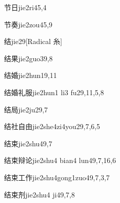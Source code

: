 \begin{verbete}{节日}{jie2ri4}{5,4}
\end{verbete}

\begin{verbete}{节奏}{jie2zou4}{5,9}
\end{verbete}

\begin{verbete}{结}{jie2}{9}[Radical 糸]
\end{verbete}

\begin{verbete}{结果}{jie2guo3}{9,8}
\end{verbete}

\begin{verbete}{结婚}{jie2hun1}{9,11}
\end{verbete}

\begin{verbete}{结婚礼服}{jie2hun1 li3 fu2}{9,11,5,8}
\end{verbete}

\begin{verbete}{结局}{jie2ju2}{9,7}
\end{verbete}

\begin{verbete}{结社自由}{jie2she4zi4you2}{9,7,6,5}
\end{verbete}

\begin{verbete}{结束}{jie2shu4}{9,7}
\end{verbete}

\begin{verbete}{结束辩论}{jie2shu4 bian4 lun4}{9,7,16,6}
\end{verbete}

\begin{verbete}{结束工作}{jie2shu4gong1zuo4}{9,7,3,7}
\end{verbete}

\begin{verbete}{结束剂}{jie2shu4 ji4}{9,7,8}
\end{verbete}

